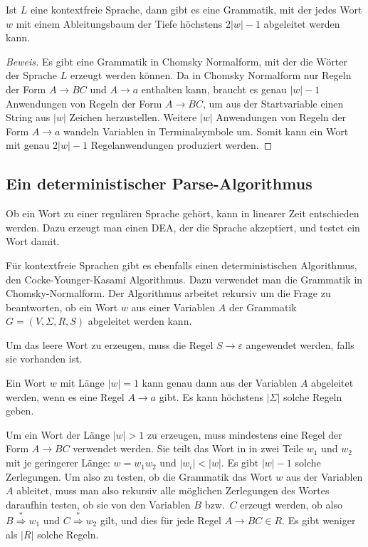\begin{satz}
Ist $L$ eine kontextfreie Sprache, dann gibt es eine Grammatik,
mit der jedes Wort $w$ mit einem Ableitungsbaum der Tiefe höchstens
$2|w|-1$ abgeleitet werden kann.
\end{satz}

\begin{proof}[Beweis]
Es gibt eine Grammatik in Chomsky Normalform, mit der die Wörter
der Sprache $L$ erzeugt werden können.
Da in Chomsky Normalform nur Regeln der Form $A\to BC$ und $A\to a$
enthalten kann, braucht es genau $|w|-1$ Anwendungen von Regeln der Form
$A\to BC$, um aus der Startvariable einen String aus $|w|$ Zeichen
herzustellen. Weitere $|w|$ Anwendungen von Regeln der Form $A\to a$
wandeln Variablen in Terminalsymbole um. Somit kann ein Wort mit
genau $2|w|-1$ Regelanwendungen produziert werden.
\end{proof}


\subsection{Ein deterministischer Parse-Algorithmus}
Ob ein Wort zu einer regulären Sprache gehört, kann in linearer
Zeit entschieden werden. Dazu erzeugt man einen DEA, der die Sprache
akzeptiert, und testet ein Wort damit.

Für kontextfreie Sprachen gibt es ebenfalls einen deterministischen
Algorithmus, den Cocke-Younger-Kasami Algorithmus. Dazu verwendet
man die Grammatik in Chomsky-Normalform. Der Algorithmus arbeitet
rekursiv um die Frage zu beantworten, ob ein Wort $w$ aus einer
Variablen $A$ der Grammatik $G=(V,\Sigma,R,S)$  abgeleitet
werden kann.

Um das leere Wort zu erzeugen, muss die Regel $S\to\varepsilon$
angewendet werden, falls sie vorhanden ist.

Ein Wort $w$ mit Länge $|w|=1$ kann genau dann aus der Variablen 
$A$ abgeleitet werden, wenn es eine Regel $A\to a$ gibt. 
Es kann höchstens $|\Sigma|$ solche Regeln geben.

Um ein Wort der Länge $|w|>1$ zu erzeugen, muss mindestens eine
Regel der Form
$A\to BC$ verwendet werden. Sie teilt das Wort in in zwei Teile
$w_1$ und $w_2$ mit je geringerer Länge: $w=w_1w_2$ und 
$|w_i|<|w|$. Es gibt $|w|-1$ solche Zerlegungen. Um also zu testen,
ob die Grammatik das Wort $w$ aus der Variablen $A$ ableitet,
muss man also rekursiv alle möglichen
Zerlegungen des Wortes daraufhin testen, ob sie von den Variablen
$B$ bzw.~$C$ erzeugt werden, ob also $B\overset{*}\Rightarrow w_1$
und $C\overset{*}\Rightarrow w_2$ gilt, und dies für jede
Regel $A\to BC\in R$. Es gibt weniger als $|R|$ solche Regeln.

